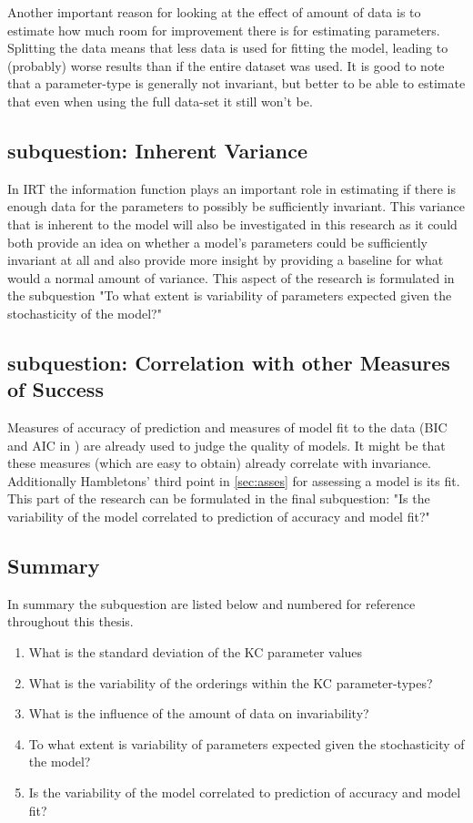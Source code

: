 \documentclass{scrartcl}
\begin{document}
Another important reason for looking at the effect of amount of data is to estimate how much room for improvement there is for estimating parameters. Splitting the data means that less data is used for fitting the model, leading to (probably) worse results than if the entire dataset was used. It is good to note that a parameter-type is generally not invariant, but better to be able to estimate that even when using the full data-set it still won't be.

\subsection{subquestion: Inherent Variance}
In IRT the information function plays an important role in estimating if there is enough data for the parameters to possibly be sufficiently invariant. This variance that is inherent to the model will also be investigated in this research as it could both provide an idea on whether a model's parameters could be sufficiently invariant at all and also provide more insight by providing a baseline for what would a normal amount of variance. This aspect of the research is formulated in the subquestion "To what extent is variability of parameters expected given the stochasticity of the model?"

\subsection{subquestion: Correlation with other Measures of Success}
Measures of accuracy of prediction and measures of model fit to the data (BIC and AIC in \cite{lfa}) are already used to judge the quality of models. It might be that these measures (which are easy to obtain) already correlate with invariance. Additionally Hambletons' third point in \ref{sec:asses} for assessing a model is its fit. This part of the research can be formulated in the final subquestion: "Is the variability of the model correlated to prediction of accuracy and model fit?"

\subsection{Summary}
In summary the subquestion are listed below and numbered for reference throughout this thesis.
\begin{enumerate}
  \item What is the standard deviation of the KC parameter values
  \item What is the variability of the orderings within the KC parameter-types?
  \item What is the influence of the amount of data on invariability?
  \item To what extent is variability of parameters expected given the stochasticity of the model?
  \item Is the variability of the model correlated to prediction of accuracy and model fit?
\end{enumerate}
\end{document}
